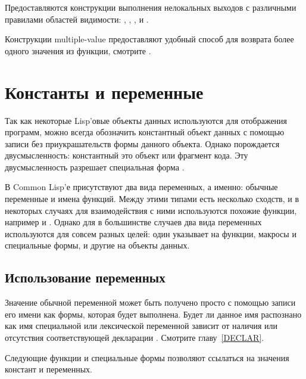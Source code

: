 Предоставляются конструкции выполнения нелокальных выходов с различными 
правилами областей видимости: , , ,
 и .

Конструкции multiple-value предоставляют удобный способ для возврата более одного
значения из функции, смотрите .

\section{Константы и переменные}
\label{FUNCTION-NAME-SECTION}


Так как некоторые Lisp'овые объекты данных используются для отображения
программ, можно всегда обозначить константный объект данных с помощью записи
без приукрашательств формы данного объекта. Однако порождается двусмысленность:
константный это объект или фрагмент кода. Эту двусмысленность разрешает
специальная форма .

В Common Lisp'е присутствуют два вида переменных, а именно: обычные переменные и
имена функций. Между этими типами есть несколько сходств, и в некоторых случаях
для взаимодействия с ними используются похожие функции, например  и
. 
Однако для в большинстве случаев два вида переменных используются для совсем
разных целей: один указывает на функции, макросы и специальные формы, и другие
на объекты данных.

\subsection{Использование переменных}

Значение обычной переменной может быть получено просто с помощью записи его
имени как формы, которая будет выполнена. Будет ли данное имя распознано как имя
специальной или лексической переменной зависит от наличия или отсутствия
соответствующей декларации . Смотрите главу~\ref{DECLAR}.

Следующие функции и специальные формы позволяют ссылаться на значения констант и
переменных.

